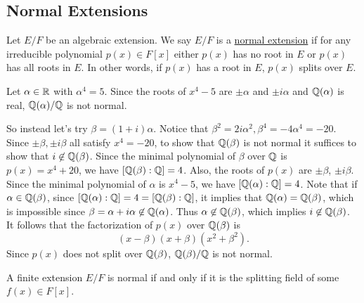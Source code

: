 \documentclass[11pt]{article}
\begin{document}
\subsection{Normal Extensions}

\begin{definition}
    Let $E/F$ be an algebraic extension. We say $E/F$ is a \ul{normal extension} if for any irreducible polynomial $p(x)\in F[x]$ either $p(x)$ has no root in $E$ or $p(x)$ has all roots in $E$. In other words, if $p(x)$ has a root in $E$, $p(x)$ splits over $E$.
\end{definition}

\begin{example}
    Let $\alpha\in\mathbb{R}$ with $\alpha^4=5$. Since the roots of $x^4-5$ are $\pm\alpha$ and $\pm i\alpha$ and $\mathbb{Q}(\alpha)$ is real, $\mathbb{Q}(\alpha)/\mathbb{Q}$ is not normal.

    So instead let's try $\beta=(1+i)\alpha$. Notice that $\beta^2=2i\alpha^2,\beta^4=-4\alpha^4=-20$. Since $\pm\beta,\pm i\beta$ all satisfy $x^4=-20$, to show that $\mathbb{Q}(\beta)$ is not normal it suffices to show that $i\not\in\mathbb{Q}(\beta)$. Since the minimal polynomial of $\beta$ over $\mathbb{Q}$ is $p(x)=x^4+20$, we have $[\mathbb{Q}(\beta):\mathbb{Q}]=4$. Also, the roots of $p(x)$ are $\pm\beta$, $\pm i\beta$. Since the minimal polynomial of $\alpha$ is $x^4-5$, we have $[\mathbb{Q}(\alpha):\mathbb{Q}]=4$. Note that if $\alpha\in\mathbb{Q}(\beta)$, since $[\mathbb{Q}(\alpha):\mathbb{Q}]=4=[\mathbb{Q}(\beta):\mathbb{Q}]$, it implies that $\mathbb{Q}(\alpha)=\mathbb{Q}(\beta)$, which is impossible since $\beta=\alpha+i\alpha\not\in\mathbb{Q}(\alpha)$. Thus $\alpha\not\in\mathbb{Q}(\beta)$, which implies $i\not\in\mathbb{Q}(\beta)$. It follows that the factorization of $p(x)$ over $\mathbb{Q}(\beta)$ is
    \[(x-\beta)(x+\beta)(x^2+\beta^2).\]
    Since $p(x)$ does not split over $\mathbb{Q}(\beta)$, $\mathbb{Q}(\beta)/\mathbb{Q}$ is not normal.
\end{example}

\begin{theorem}
    A finite extension $E/F$ is normal if and only if it is the splitting field of some $f(x)\in F[x]$.
\end{theorem}
\end{document}
